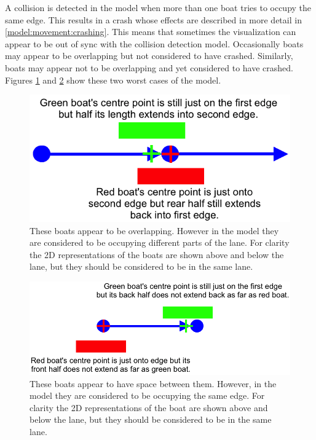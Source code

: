       A collision is detected in the model when more than one boat tries to occupy the same edge. This results in a crash whose effects are described in more detail in \ref{model:movement:crashing}. This means that sometimes the visualization can appear to be out of sync with the collision detection model. Occasionally boats may appear to be overlapping but not considered to have crashed. Similarly, boats may appear not to be overlapping and yet considered to have crashed. Figures \ref{fig:model:worstcase_overlapping} and \ref{fig:model:worstcase_no_overlap} show these two worst cases of the model.
      
      \begin{figure}
      \begin{center}
      	\includegraphics[scale=0.6]{images/overlap_worst_case.png}
      	\caption{These boats appear to be overlapping. However in the model they are considered to be occupying different parts of the lane. For clarity the 2D representations of the boats are shown above and below the lane, but they should be considered to be in the same lane.}
      	\label{fig:model:worstcase_overlapping}
      \end{center}
      \end{figure}
      
      \begin{figure}
      \begin{center}
      	\includegraphics[scale=0.6]{images/worstcase_no_overlap.png}
      	\caption{These boats appear to have space between them. However, in the model they are considered to be occupying the same edge. For clarity the 2D representations of the boat are shown above and below the lane, but they should be considered to be in the same lane.}
      	\label{fig:model:worstcase_no_overlap}
      \end{center}
      \end{figure}
      
